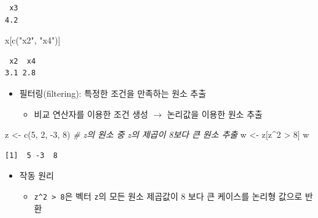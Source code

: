 \documentclass[
  11pt,
]{krantz}
\newenvironment{Shaded}{\begin{snugshade}}{\end{snugshade}}
\newcommand{\CommentTok}[1]{\textcolor[rgb]{0.37,0.37,0.37}{\textit{#1}}}
\newcommand{\DecValTok}[1]{\textcolor[rgb]{0.06,0.06,0.06}{#1}}
\newcommand{\FunctionTok}[1]{\textcolor[rgb]{0,0,0}{#1}}
\newcommand{\NormalTok}[1]{#1}
\newcommand{\OtherTok}[1]{\textcolor[rgb]{0.37,0.37,0.37}{#1}}
\newcommand{\SpecialCharTok}[1]{\textcolor[rgb]{0,0,0}{#1}}
\newcommand{\StringTok}[1]{\textcolor[rgb]{0.5,0.5,0.5}{#1}}
\providecommand{\tightlist}{%
  \setlength{\itemsep}{0pt}\setlength{\parskip}{0pt}}
\begin{document}
\begin{verbatim}
 x3 
4.2 
\end{verbatim}

\begin{Shaded}
\begin{Highlighting}[]
\NormalTok{x[}\FunctionTok{c}\NormalTok{(}\StringTok{"x2"}\NormalTok{, }\StringTok{"x4"}\NormalTok{)]}
\end{Highlighting}
\end{Shaded}

\begin{verbatim}
 x2  x4 
3.1 2.8 
\end{verbatim}

\normalsize

\begin{itemize}
\tightlist
\item
  필터링(filtering): 특정한 조건을 만족하는 원소 추출

  \begin{itemize}
  \tightlist
  \item
    비교 연산자를 이용한 조건 생성 \(\rightarrow\) 논리값을 이용한 원소 추출
  \end{itemize}
\end{itemize}

\footnotesize

\begin{Shaded}
\begin{Highlighting}[]
\NormalTok{z }\OtherTok{\textless{}{-}} \FunctionTok{c}\NormalTok{(}\DecValTok{5}\NormalTok{, }\DecValTok{2}\NormalTok{, }\SpecialCharTok{{-}}\DecValTok{3}\NormalTok{, }\DecValTok{8}\NormalTok{)}
\CommentTok{\# z의 원소 중 z의 제곱이 8보다 큰 원소 추출}
\NormalTok{w }\OtherTok{\textless{}{-}}\NormalTok{ z[z}\SpecialCharTok{\^{}}\DecValTok{2} \SpecialCharTok{\textgreater{}} \DecValTok{8}\NormalTok{]}
\NormalTok{w}
\end{Highlighting}
\end{Shaded}

\begin{verbatim}
[1]  5 -3  8
\end{verbatim}

\normalsize

\begin{itemize}
\tightlist
\item
  작동 원리

  \begin{itemize}
  \tightlist
  \item
    \texttt{z\^{}2\ \textgreater{}\ 8}은 벡터 \texttt{z}의 모든 원소 제곱값이 8 보다 큰 케이스를 논리형 값으로 반환
  \end{itemize}
\end{itemize}
\end{document}
